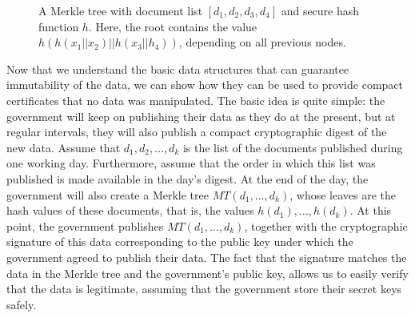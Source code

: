 \begin{figure}
\caption{A Merkle tree with document list $[d_1,d_2,d_3,d_4]$ and secure hash function $h$. Here, the root contains the value $h(h(x_1||x_2)||h(x_3||h_4))$, depending on all previous nodes.}%
\label{merkle_fig}
\end{figure}

\medskip
{} Now that we understand the basic data structures that can guarantee immutability of the data, we can show how they can be used to provide compact certificates that no data was manipulated. The basic idea is quite simple: the government will keep on publishing their data as they do at the present, but at regular intervals, they will also publish a compact cryptographic digest of the new data. Assume that $d_1,d_2,\ldots ,d_k$ is the list of the documents published during one working day. Furthermore, assume that the order in which this list was published is made available in the day's digest. At the end of the day, the government will also create a Merkle tree $MT(d_1,\ldots ,d_k)$, whose leaves are the hash values of these documents, that is, the values $h(d_1),\ldots ,h(d_k)$. At this point, the government publishes $MT(d_1,\ldots ,d_k)$, together with the cryptographic signature of this data corresponding to the public key under which the government agreed to publish their data. The fact that the signature matches the data in the Merkle tree and the government's public key, allows us to easily verify that the data is legitimate, assuming that the government store their secret keys safely.

